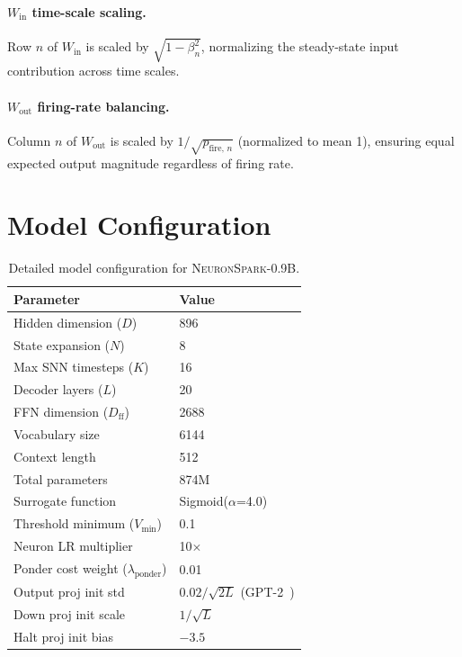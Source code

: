\documentclass[10pt,twocolumn]{article}
\newcommand{\model}{\textsc{NeuronSpark}}
\newcommand{\vmin}{V_{\text{min}}}
\begin{document}
\paragraph{$W_{\text{in}}$ time-scale scaling.}
Row $n$ of $W_{\text{in}}$ is scaled by $\sqrt{1 - \beta_n^2}$, normalizing the steady-state input contribution across time scales.

\paragraph{$W_{\text{out}}$ firing-rate balancing.}
Column $n$ of $W_{\text{out}}$ is scaled by $1/\sqrt{p_{\text{fire},\,n}}$ (normalized to mean 1), ensuring equal expected output magnitude regardless of firing rate.


\section{Model Configuration}
\label{app:config}

\begin{table}[H]
\centering
\caption{Detailed model configuration for \model{}-0.9B.}
\begin{tabular}{ll}
\toprule
\textbf{Parameter} & \textbf{Value} \\
\midrule
Hidden dimension ($D$) & 896 \\
State expansion ($N$) & 8 \\
Max SNN timesteps ($K$) & 16 \\
Decoder layers ($L$) & 20 \\
FFN dimension ($D_{\text{ff}}$) & 2688 \\
Vocabulary size & 6144 \\
Context length & 512 \\
Total parameters & 874M \\
\midrule
Surrogate function & Sigmoid($\alpha$=4.0) \\
Threshold minimum ($\vmin$) & 0.1 \\
Neuron LR multiplier & 10$\times$ \\
Ponder cost weight ($\lambda_{\text{ponder}}$) & 0.01 \\
\midrule
Output proj init std & $0.02 / \sqrt{2L}$ (GPT-2~\citep{radford2019language}) \\
Down proj init scale & $1 / \sqrt{L}$ \\
Halt proj init bias & $-3.5$ \\
\bottomrule
\end{tabular}
\end{table}
\end{document}
